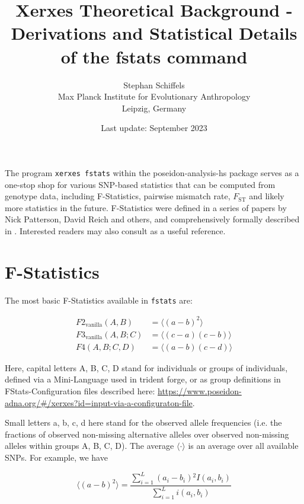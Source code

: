 \documentclass{article}
\begin{document}
\title{Xerxes Theoretical Background - Derivations and Statistical Details of the fstats command}
\author{Stephan Schiffels\\Max Planck Institute for Evolutionary Anthropology\\ Leipzig, Germany}
\date{Last update: September 2023}
\maketitle

\tableofcontents
\vspace{10mm}

The program \texttt{xerxes fstats} within the poseidon-analysis-hs package serves as a one-stop shop for various SNP-based statistics that can be computed from genotype data, including F-Statistics, pairwise mismatch rate, $F_\text{ST}$ and likely more statistics in the future. F-Statistics were defined in a series of papers by Nick Patterson, David Reich and others, and comprehensively formally described in \cite{Patterson2012-yq}. Interested readers may also consult \cite{Peter2016-ml} as a useful reference.

\section{F-Statistics}

The most basic F-Statistics available in \texttt{fstats} are:

\begin{align}
F2_\text{vanilla}(A, B) &= \langle(a-b)^2\rangle\\
F3_\text{vanilla}(A, B; C) &= \langle (c-a)(c-b) \rangle\\
F4(A, B; C, D) &= \langle (a-b)(c-d) \rangle
\end{align}

Here, capital letters A, B, C, D stand for individuals or groups of individuals, defined via a Mini-Language used in trident forge, or as group definitions in FStats-Configuration files described here: \url{https://www.poseidon-adna.org/#/xerxes?id=input-via-a-configuraton-file}.

Small letters a, b, c, d here stand for the observed allele frequencies (i.e. the fractions of observed non-missing alternative alleles over observed non-missing alleles within groups A, B, C, D). The average \(\langle \cdot\rangle\) is an average over all available SNPs. For example, we have

\begin{equation}
\langle(a-b)^2\rangle=\frac{\sum _{i=1}^L \left(a_i-b_i\right){}^2 I\left(a_i,b_i\right)}{\sum _{i=1}^L i\left(a_i,b_i\right)}
\end{equation}
\end{document}
